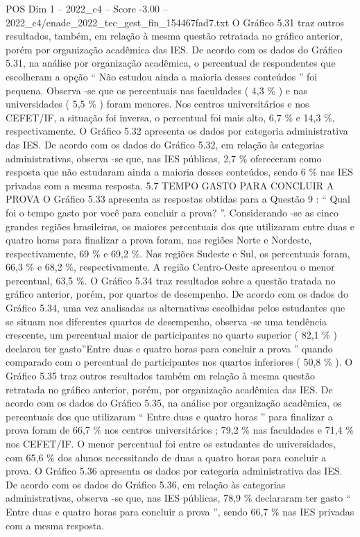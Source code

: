 \begin{textsample}{POS Dim 1 – 2022\_c4 – Score -3.00 – 2022\_c4/enade\_2022\_tec\_gest\_fin\_154467fad7.txt}
O Gráfico 5.31 traz outros resultados, também, em relação à mesma questão retratada no gráfico anterior, porém por organização acadêmica das IES.
De acordo com os dados do Gráfico 5.31, na análise por organização acadêmica, o percentual de respondentes que escolheram a opção “ Não estudou ainda a maioria desses conteúdos ” foi pequena.
Observa -se que os percentuais nas faculdades ( 4,3 \% ) e nas universidades ( 5,5 \% ) foram menores.
Nos centros universitários e nos CEFET/IF, a situação foi inversa, o percentual foi mais alto, 6,7 \% e 14,3 \%, respectivamente.
O Gráfico 5.32 apresenta os dados por categoria administrativa das IES.
De acordo com os dados do Gráfico 5.32, em relação às categorias administrativas, observa -se que, nas IES públicas, 2,7 \% ofereceram como resposta que não estudaram ainda a maioria desses conteúdos, sendo 6 \% nas IES privadas com a mesma resposta. 5.7 TEMPO GASTO PARA CONCLUIR A PROVA O Gráfico 5.33 apresenta as respostas obtidas para a Questão 9 : “ Qual foi o tempo gasto por você para concluir a prova? ”.
Considerando -se as cinco grandes regiões brasileiras, os maiores percentuais dos que utilizaram entre duas e quatro horas para finalizar a prova foram, nas regiões Norte e Nordeste, respectivamente, 69 \% e 69,2 \%.
Nas regiões Sudeste e Sul, os percentuais foram, 66,3 \% e 68,2 \%, respectivamente.
A região Centro-Oeste apresentou o menor percentual, 63,5 \%.
O Gráfico 5.34 traz resultados sobre a questão tratada no gráfico anterior, porém, por quartos de desempenho.
De acordo com os dados do Gráfico 5.34, uma vez analisadas as alternativas escolhidas pelos estudantes que se situam nos diferentes quartos de desempenho, observa -se uma tendência crescente, um percentual maior de participantes no quarto superior ( 82,1 \% ) declarou ter gasto”Entre duas e quatro horas para concluir a prova ” quando comparado com o percentual de participantes nos quartos inferiores ( 50,8 \% ).
O Gráfico 5.35 traz outros resultados também em relação à mesma questão retratada no gráfico anterior, porém, por organização acadêmica das IES.
De acordo com os dados do Gráfico 5.35, na análise por organização acadêmica, os percentuais dos que utilizaram “ Entre duas e quatro horas ” para finalizar a prova foram de 66,7 \% nos centros universitários ; 79,2 \% nas faculdades e 71,4 \% nos CEFET/IF.
O menor percentual foi entre os estudantes de universidades, com 65,6 \% dos alunos necessitando de duas a quatro horas para concluir a prova.
O Gráfico 5.36 apresenta os dados por categoria administrativa das IES.
De acordo com os dados do Gráfico 5.36, em relação às categorias administrativas, observa -se que, nas IES públicas, 78,9 \% declararam ter gasto “ Entre duas e quatro horas para concluir a prova ”, sendo 66,7 \% nas IES privadas com a mesma resposta.

\end{textsample}
